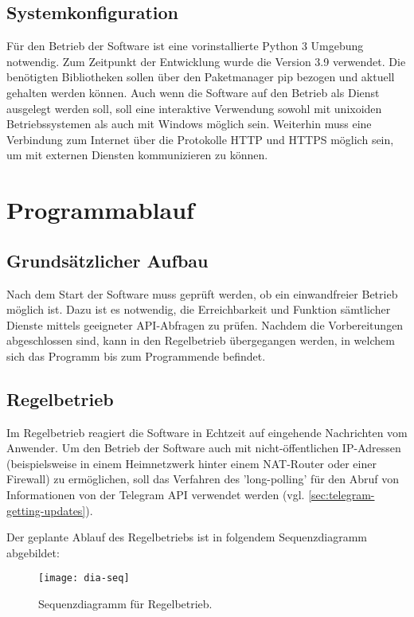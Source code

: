 \subsection{Systemkonfiguration}
Für den Betrieb der Software ist eine vorinstallierte Python 3 Umgebung notwendig. Zum Zeitpunkt der Entwicklung wurde die Version 3.9 verwendet. Die benötigten Bibliotheken sollen über den Paketmanager pip bezogen und aktuell gehalten werden können. Auch wenn die Software auf den Betrieb als Dienst ausgelegt werden soll, soll eine interaktive Verwendung sowohl mit unixoiden Betriebssystemen als auch mit Windows möglich sein. Weiterhin muss eine Verbindung zum Internet über die Protokolle HTTP und HTTPS möglich sein, um mit externen Diensten kommunizieren zu können.

\section{Programmablauf}

\subsection{Grundsätzlicher Aufbau}
\label{sec:grundsaetzlicher-aufbau}

Nach dem Start der Software muss geprüft werden, ob ein einwandfreier Betrieb möglich ist. Dazu ist es notwendig, die Erreichbarkeit und Funktion sämtlicher Dienste mittels geeigneter API-Abfragen zu prüfen. Nachdem die Vorbereitungen abgeschlossen sind, kann in den Regelbetrieb übergegangen werden, in welchem sich das Programm bis zum Programmende befindet. 

\subsection{Regelbetrieb}

Im Regelbetrieb reagiert die Software in Echtzeit auf eingehende Nachrichten vom Anwender. 
Um den Betrieb der Software auch mit nicht-öffentlichen IP-Adressen (beispielsweise in einem Heimnetzwerk hinter einem NAT-Router oder einer Firewall) zu ermöglichen, soll das Verfahren des 'long-polling' für den Abruf von Informationen von der Telegram API verwendet werden (vgl. \autoref{sec:telegram-getting-updates}).

Der geplante Ablauf des Regelbetriebs ist in folgendem Sequenzdiagramm abgebildet:

\newpage

\begin{figure}[h!]
\centering
\texttt{[image: dia-seq]}
\caption{Sequenzdiagramm für Regelbetrieb.}
\end{figure}

